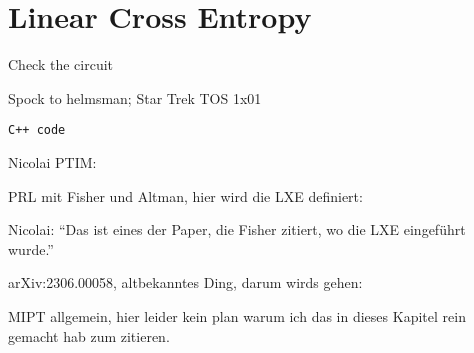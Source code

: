 \chapter{Linear Cross Entropy}
\label{ch:lxe}
\epigraph{Check the circuit}{Spock to helmsman; Star Trek TOS 1x01
\cite{butlerCage1988}}

\texttt{C++ code}

Nicolai PTIM: \cite{langEntanglementTransitionProjective2020}

PRL mit Fisher und Altman, hier wird die LXE definiert: \cite{liCrossEntropyBenchmark2023}

Nicolai: \enquote{Das ist eines der Paper, die Fisher zitiert, wo die LXE eingeführt wurde.} \cite{baoSymmetryEnrichedPhases2021}

arXiv:2306.00058, altbekanntes Ding, darum wirds gehen: \cite{tikhanovskayaUniversalityCrossEntropy2023}

MIPT allgemein, hier leider kein plan warum ich das in dieses Kapitel rein
gemacht hab zum zitieren. \cite{baoTheoryPhaseTransition2020}
